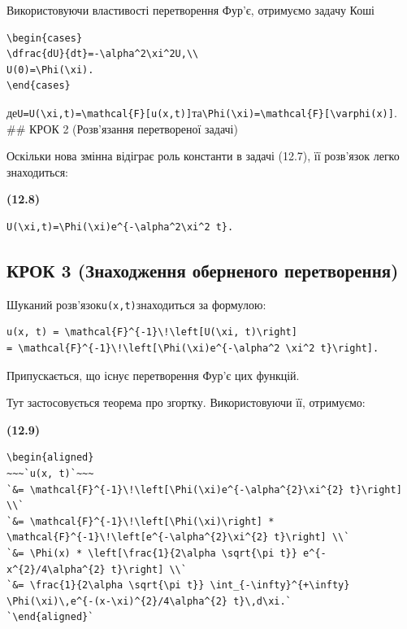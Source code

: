 \documentclass[
  ukrainian,
]{article}
\begin{document}
Використовуючи властивості перетворення Фур'є, отримуємо задачу Коші

\begin{verbatim}
\begin{cases}
\dfrac{dU}{dt}=-\alpha^2\xi^2U,\\
U(0)=\Phi(\xi).
\end{cases}
\end{verbatim}

де\texttt{U=U(\textbackslash{}xi,t)=\textbackslash{}mathcal\{F\}{[}u(x,t){]}}та\texttt{\textbackslash{}Phi(\textbackslash{}xi)=\textbackslash{}mathcal\{F\}{[}\textbackslash{}varphi(x){]}}.
\#\# КРОК 2 (Розв'язання перетвореної задачі)

Оскільки нова змінна відіграє роль константи в задачі (12.7), її
розв'язок легко знаходиться:

\textbf{(12.8)}

\begin{verbatim}
U(\xi,t)=\Phi(\xi)e^{-\alpha^2\xi^2 t}.
\end{verbatim}

\subsection{КРОК 3 (Знаходження оберненого
перетворення)}\label{ux43aux440ux43eux43a-3-ux437ux43dux430ux445ux43eux434ux436ux435ux43dux43dux44f-ux43eux431ux435ux440ux43dux435ux43dux43eux433ux43e-ux43fux435ux440ux435ux442ux432ux43eux440ux435ux43dux43dux44f}

Шуканий розв'язок\texttt{u(x,t)}знаходиться за формулою:

\begin{verbatim}
u(x, t) = \mathcal{F}^{-1}\!\left[U(\xi, t)\right]
= \mathcal{F}^{-1}\!\left[\Phi(\xi)e^{-\alpha^2 \xi^2 t}\right].
\end{verbatim}

Припускається, що існує перетворення Фур'є цих функцій.

Тут застосовується теорема про згортку. Використовуючи її, отримуємо:

\textbf{(12.9)}

\begin{verbatim}
\begin{aligned}
~~~`u(x, t)`~~~
`&= \mathcal{F}^{-1}\!\left[\Phi(\xi)e^{-\alpha^{2}\xi^{2} t}\right] \\`
`&= \mathcal{F}^{-1}\!\left[\Phi(\xi)\right] * \mathcal{F}^{-1}\!\left[e^{-\alpha^{2}\xi^{2} t}\right] \\`
`&= \Phi(x) * \left[\frac{1}{2\alpha \sqrt{\pi t}} e^{-x^{2}/4\alpha^{2} t}\right] \\`
`&= \frac{1}{2\alpha \sqrt{\pi t}} \int_{-\infty}^{+\infty} \Phi(\xi)\,e^{-(x-\xi)^{2}/4\alpha^{2} t}\,d\xi.`
`\end{aligned}`
\end{verbatim}
\end{document}
